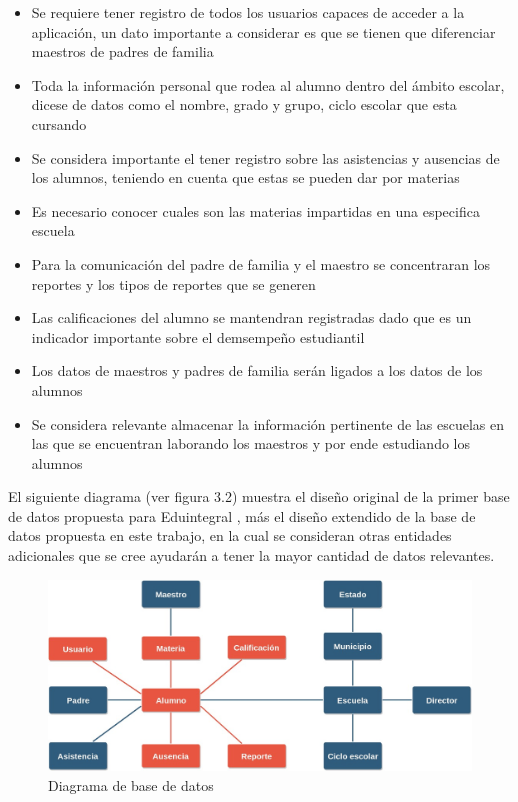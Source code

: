     \begin{itemize}
        \item Se requiere tener registro de todos los usuarios capaces de acceder a la aplicación, un dato importante a considerar es que se tienen que diferenciar maestros de padres de familia
        
        \item Toda la información personal que rodea al alumno dentro del ámbito escolar, dicese de datos como el nombre, grado y grupo, ciclo escolar que esta cursando
        
        \item Se considera importante el tener registro sobre las asistencias y ausencias de los alumnos, teniendo en cuenta que estas se pueden dar por materias
        
        \item Es necesario conocer cuales son las materias impartidas en una especifica escuela
        
        \item Para la comunicación del padre de familia y el maestro se concentraran los reportes y los tipos de reportes que se generen
        
        \item Las calificaciones del alumno se mantendran registradas dado que es un indicador importante sobre el demsempeño estudiantil
        
        \item Los datos de maestros y padres de familia serán ligados a los datos de los alumnos 
        
        \item Se considera relevante almacenar la información pertinente de las escuelas en las que se encuentran laborando los maestros y por ende estudiando los alumnos
        
    \end{itemize}
    
    El siguiente diagrama (ver figura 3.2) muestra el diseño original de la primer base de datos propuesta para Eduintegral \cite{eduintegral}, más el diseño extendido de la base de datos propuesta en este trabajo, en la cual se consideran otras entidades adicionales que se cree ayudarán a tener la mayor cantidad de datos relevantes.
    
    \begin{figure}[H]
        \centering
        \includegraphics[scale=0.4]{Propuesta_Plantilla_Tesis_LaTeX_UAG/imagenes/base_de_datos_2.jpg}
        \caption{Diagrama de base de datos}
        \label{fig:diagramabasededatos}
    \end{figure}
    

